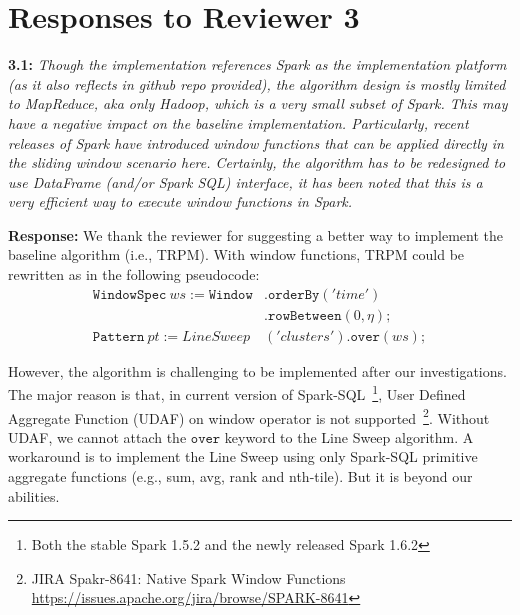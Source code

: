 \section{Responses to Reviewer 3}
\textbf{3.1:} \emph{Though the implementation references Spark as the implementation
platform (as it also reflects in github repo provided), the algorithm design is
mostly limited to MapReduce, aka only Hadoop, which is a very small subset of
Spark. This may have a negative impact on the baseline implementation.
Particularly, recent releases of Spark have introduced window functions that can
be applied directly in the sliding window scenario here. Certainly, the algorithm
has to be redesigned to use DataFrame (and/or Spark SQL) interface, it has
been noted that this is a very efficient way to execute window functions in
Spark.}

\textbf{Response:}
We thank the reviewer for suggesting a better way to implement
the baseline algorithm (i.e., TRPM). With window functions,
TRPM could be rewritten as in the following pseudocode:
\begin{equation*}
\begin{aligned}
 \mathtt{WindowSpec}\ ws := \mathtt{Window}&.\mathtt{orderBy}('time') \\
 				&.\mathtt{rowBetween}(0, \eta); \\
 \mathtt{Pattern}\ pt :=  LineSweep&('clusters').\mathtt{over}(ws); 
\end{aligned}
\end{equation*}

However, the algorithm is challenging
to be implemented after our investigations. The major reason is
that, in current version of Spark-SQL~\footnote{Both the stable Spark 1.5.2 and the newly released Spark 1.6.2}, 
User Defined Aggregate Function (UDAF) on window operator is not supported~\footnote{JIRA Spakr-8641: Native Spark Window Functions \url{https://issues.apache.org/jira/browse/SPARK-8641}}. 
Without UDAF, we cannot attach the $\mathtt{over}$ keyword to
the Line Sweep algorithm. A workaround is to implement the Line Sweep using only Spark-SQL primitive aggregate 
functions (e.g., sum, avg, rank and nth-tile). But it
is beyond our abilities.
%

